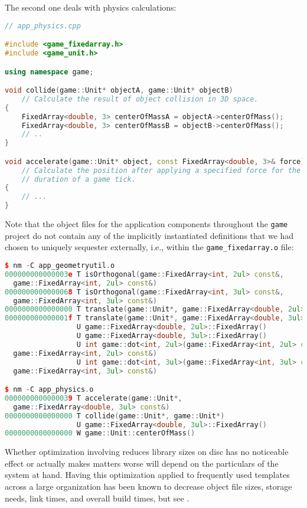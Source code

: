 \noindent The second one deals with physics calculations:

\begin{lstlisting}[language=C++]
// app_physics.cpp

#include <game_fixedarray.h>
#include <game_unit.h>

using namespace game;

void collide(game::Unit* objectA, game::Unit* objectB)
    // Calculate the result of object collision in 3D space.
{
    FixedArray<double, 3> centerOfMassA = objectA->centerOfMass();
    FixedArray<double, 3> centerOfMassB = objectB->centerOfMass();
    // ..
}

void accelerate(game::Unit* object, const FixedArray<double, 3>& force)
    // Calculate the position after applying a specified force for the
    // duration of a game tick.
{
    // ...
}
\end{lstlisting}
    
\noindent Note that the object files for the application components throughout the
\lstinline!game! project do not contain any of the implicitly
instantiated definitions that we had chosen to uniquely sequester
externally, i.e., within the \lstinline!game_fixedarray.o! file:

\begin{lstlisting}[language=C++]
$ nm -C app_geometryutil.o
000000000000003e T isOrthogonal(game::FixedArray<int, 2ul> const&,
  game::FixedArray<int, 2ul> const&)
0000000000000068 T isOrthogonal(game::FixedArray<int, 3ul> const&,
  game::FixedArray<int, 3ul> const&)
0000000000000000 T translate(game::Unit*, game::FixedArray<double, 2ul> const&)
000000000000001f T translate(game::Unit*, game::FixedArray<double, 3ul> const&)
                 U game::FixedArray<double, 2ul>::FixedArray()
                 U game::FixedArray<double, 3ul>::FixedArray()
                 U int game::dot<int, 2ul>(game::FixedArray<int, 2ul> const&,
  game::FixedArray<int, 2ul> const&)
                 U int game::dot<int, 3ul>(game::FixedArray<int, 3ul> const&,
  game::FixedArray<int, 3ul> const&)

$ nm -C app_physics.o
0000000000000039 T accelerate(game::Unit*,
  game::FixedArray<double, 3ul> const&)
0000000000000000 T collide(game::Unit*, game::Unit*)
                 U game::FixedArray<double, 3ul>::FixedArray()
0000000000000000 W game::Unit::centerOfMass()
\end{lstlisting}
    
\noindent Whether optimization involving  reduces library sizes on disc has no noticeable effect or
actually makes matters worse will depend on the particulars of the
system at hand. Having this optimization applied to frequently used
templates across a large organization has been known to decrease object
file sizes, storage needs, link times, and overall build times, but see .

